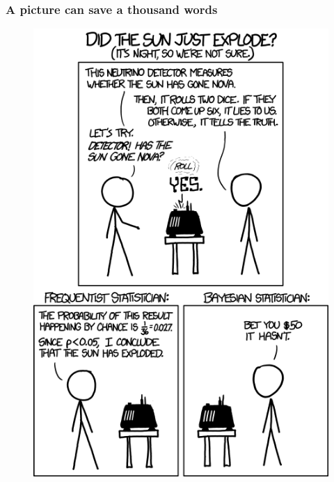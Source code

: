 \documentclass{beamer}
\begin{document}
 \begin{frame}
  \frametitle{\bf A picture can save a thousand words}
  
  \begin{figure}
   \includegraphics[width=\textwidth,height=.8\textheight,keepaspectratio]{frequentists_vs_bayesians.png}
  \end{figure}  
  
 \end{frame}

 
\end{document}
